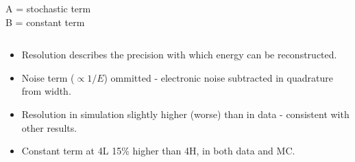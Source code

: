 \documentclass[10pt]{beamer}
\begin{document}
\begin{frame}
\begin{columns}
\begin{equation*}
\end{equation*}
A = stochastic term\\
B = constant term
\end{columns}
\begin{itemize}
\item Resolution describes the precision with which energy can be reconstructed.
\item Noise term ($\propto 1/E$) ommitted - electronic noise subtracted in quadrature from width.
\item Resolution in simulation slightly higher (worse) than in data - consistent with other \geant results.
\item Constant term at 4L 15\% higher than 4H, in both data and MC.
\end{itemize}
\end{frame}
\end{document}
